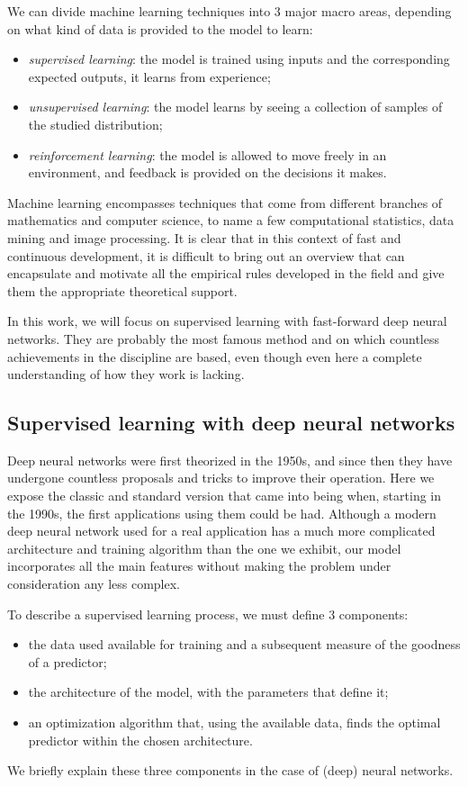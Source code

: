 We can divide machine learning techniques into 3 major macro areas, depending on what kind of data is provided to the model to learn:
\begin{itemize}
  \item \emph{supervised learning}: the model is trained using inputs and the corresponding expected outputs, 
                                    it learns from experience;
  \item \emph{unsupervised learning}: the model learns by seeing a collection of samples of the studied distribution;
  \item \emph{reinforcement learning}: the model is allowed to move freely in an environment,
                                       and feedback is provided on the decisions it makes.
\end{itemize}

Machine learning encompasses techniques that come from different branches of mathematics and computer science,
to name a few computational statistics, data mining and image processing.
It is clear that in this context of fast and continuous development,
it is difficult to bring out an overview that can encapsulate and motivate all the empirical rules developed in the field and give them the appropriate theoretical support.

In this work, we will focus on supervised learning with fast-forward deep neural networks.
They are probably the most famous method and on which countless achievements in the discipline are based,
even though even here a complete understanding of how they work is lacking.

\subsection{Supervised learning with deep neural networks}
Deep neural networks were first theorized in the 1950s,
and since then they have undergone countless proposals and tricks to improve their operation.
Here we expose the classic and standard version that came into being when, starting in the 1990s, 
the first applications using them could be had.
Although a modern deep neural network used for a real application has a much more complicated architecture and training algorithm than the one we exhibit,
our model incorporates all the main features without making the problem under consideration any less complex.

To describe a supervised learning process, we must define 3 components:
\begin{itemize}
  \item the data used available for training and a subsequent measure of the goodness of a predictor;
  \item the architecture of the model, with the parameters that define it;
  \item an optimization algorithm that, using the available data, finds the optimal predictor within the chosen architecture.
\end{itemize}
We briefly explain these three components in the case of (deep) neural networks.

